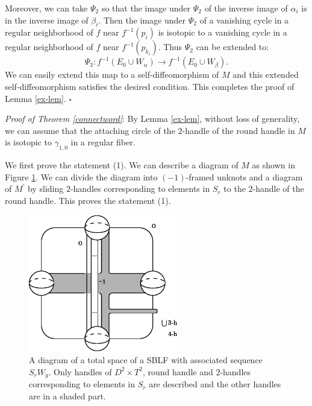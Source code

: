 \documentclass{amsart}
\theoremstyle{plain}
\theoremstyle{definition}
\begin{document}
Moreover, we can take $\Psi_2$ so that the image under $\Psi_2$ of the inverse image of $\alpha_i$ is in the inverse image of $\beta_i$. 
Then the image under $\Psi_2$ of a vanishing cycle in a regular neighborhood of $f$ near $f^{-1}(p_i)$ is isotopic to a vanishing cycle in a regular neighborhood of $f$ near $f^{-1}(p_{k_i})$. 
Thus $\Psi_2$ can be extended to: 
\[
\Psi_3:f^{-1}(E_0\cup W_\alpha)\rightarrow f^{-1}(E_0\cup W_\beta). 
\]
We can easily extend this map to a self-diffeomorphism of $M$ and this extended self-diffeomorphism satisfies the desired condition. 
This completes the proof of Lemma \ref{ex-lem}.  \hfill $\square$

{\it Proof of Theorem \ref{connectword}}: By Lemma \ref{ex-lem}, without loss of generality, we can assume that 
the attaching circle of the $2$-handle of the round handle in $M$ is isotopic to $\gamma_{1,0}$ in a regular fiber. 

\par

We first prove the statement (1). 
We can describe a diagram of $M$ as shown in Figure \ref{S_rWmfd}. 
We can divide the diagram into $(-1)$-framed unknots and a diagram of $M^\prime$ by sliding $2$-handles corresponding to elements in $S_r$ to the $2$-handle of the round handle. 
This proves the statement (1). 

\begin{figure}[htbp]
\begin{center}
\includegraphics[width=65mm]{S_rWmfd.eps}
\end{center}
\caption{A diagram of a total space of a SBLF with associated sequence $S_rW_g$. 
Only handles of $D^2\times T^2$, round handle and $2$-handles corresponding to elements in $S_r$ are described 
and the other handles are in a shaded part. }
\label{S_rWmfd}
\end{figure}
\end{document}
